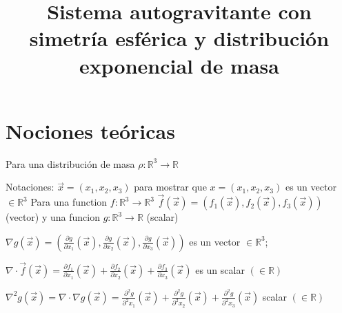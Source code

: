 \documentclass[12pt]{book}
\title{Sistema autogravitante con simetría esférica y distribución exponencial de masa}
\date{}
\begin{document}
\section*{Nociones teóricas}

Para una distribución de masa $\rho \colon \mathbb{R}^3 \to \mathbb{R}$

\begin{footnotesize}
Notaciones: 
$\vec{x} = (x_1, x_2, x_3)$ para mostrar que $x = (x_1, x_2, x_3)$ es un vector $\in \mathbb{R}^3$
Para una function  $f \colon \mathbb{R}^3 \to \mathbb{R}^3$ $\vec{f}(\vec{x}) = (f_1(\vec{x}), f_2(\vec{x}), f_3(\vec{x}) )$ (vector)
y una  funcion $g \colon \mathbb{R}^3 \to \mathbb{R}$ (scalar)
\begin{description}
\item
$\nabla g(\vec{x}) = (\frac{\partial g}{\partial x_1}(\vec{x}), \frac{\partial g}{\partial x_2}(\vec{x}), \frac{\partial g}{\partial x_3}(\vec{x}) )$ es un  vector $\in   \mathbb{R}^3$;
\item
$\nabla  \cdot  \vec{f}(\vec{x}) =  \frac{\partial f_1}{\partial x_1}(\vec{x})+ \frac{\partial f_2}{\partial x_2}(\vec{x})+ \frac{\partial f_3}{\partial x_3}(\vec{x})$ es un scalar $(\in \mathbb{R})$
\item
$\nabla^2 g(\vec{x}) = \nabla  \cdot \nabla g(\vec{x}) = \frac{\partial^2 g}{\partial^2 x_1}(\vec{x})+ \frac{\partial^2 g}{\partial^2 x_2}(\vec{x})+ \frac{\partial^2 g}{\partial^2 x_3}(\vec{x})$ scalar $(\in \mathbb{R})
$
\end{description}
\end{footnotesize}
\end{document}
